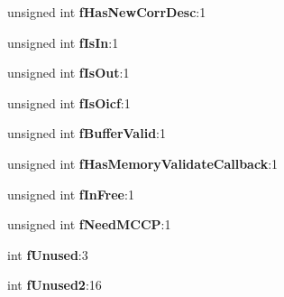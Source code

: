 \begin{DoxyCompactItemize}
unsigned int {\bfseries f\+Has\+New\+Corr\+Desc}\+:1
\item 
\mbox{\label{struct___m_i_d_l___s_t_u_b___m_e_s_s_a_g_e_a48b2754d6d69099161aa552f969083c8}} 
unsigned int {\bfseries f\+Is\+In}\+:1
\item 
\mbox{\label{struct___m_i_d_l___s_t_u_b___m_e_s_s_a_g_e_af69ea1abbb224d9156e3772e63d7f4ff}} 
unsigned int {\bfseries f\+Is\+Out}\+:1
\item 
\mbox{\label{struct___m_i_d_l___s_t_u_b___m_e_s_s_a_g_e_a0ab31f387feb45a01ec3a78b91182bdc}} 
unsigned int {\bfseries f\+Is\+Oicf}\+:1
\item 
\mbox{\label{struct___m_i_d_l___s_t_u_b___m_e_s_s_a_g_e_a52aa4f9b058dcf29b052b98323db390d}} 
unsigned int {\bfseries f\+Buffer\+Valid}\+:1
\item 
\mbox{\label{struct___m_i_d_l___s_t_u_b___m_e_s_s_a_g_e_aae9f1303defb99f3af727a6a9259a272}} 
unsigned int {\bfseries f\+Has\+Memory\+Validate\+Callback}\+:1
\item 
\mbox{\label{struct___m_i_d_l___s_t_u_b___m_e_s_s_a_g_e_a89af47fcd88d21a81c57c33a707139e3}} 
unsigned int {\bfseries f\+In\+Free}\+:1
\item 
\mbox{\label{struct___m_i_d_l___s_t_u_b___m_e_s_s_a_g_e_a6c32cc1f0d7b565106e41a0fcc34cae4}} 
unsigned int {\bfseries f\+Need\+M\+C\+CP}\+:1
\item 
\mbox{\label{struct___m_i_d_l___s_t_u_b___m_e_s_s_a_g_e_a9f97560bb4367a0c71925c1884aae659}} 
int {\bfseries f\+Unused}\+:3
\item 
\mbox{\label{struct___m_i_d_l___s_t_u_b___m_e_s_s_a_g_e_a5e9e16af1232531e61ae120c6bb3f3bf}} 
int {\bfseries f\+Unused2}\+:16
\item 
\mbox{\label{struct___m_i_d_l___s_t_u_b___m_e_s_s_a_g_e_aa8da28359de96e3e24a5c4532b86cc86}} 

\end{DoxyCompactItemize}
